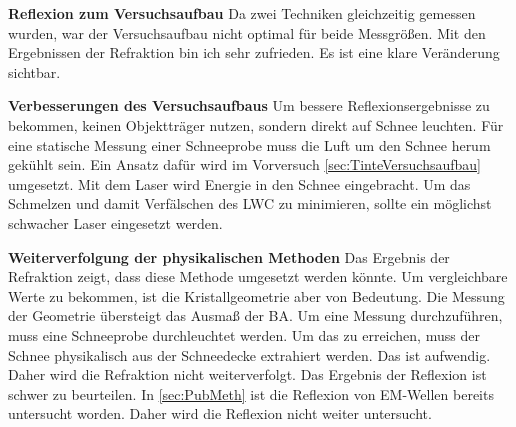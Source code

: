 \textbf{Reflexion zum Versuchsaufbau}
Da zwei Techniken gleichzeitig gemessen wurden, war der Versuchsaufbau nicht optimal für beide Messgrößen. Mit den Ergebnissen der Refraktion bin ich sehr zufrieden. Es ist eine klare Veränderung sichtbar.

\textbf{Verbesserungen des Versuchsaufbaus}
Um bessere Reflexionsergebnisse zu bekommen, keinen Objektträger nutzen, sondern direkt auf Schnee leuchten. Für eine statische Messung einer Schneeprobe muss die Luft um den Schnee herum gekühlt sein. Ein Ansatz dafür wird im Vorversuch \ref{sec:TinteVersuchsaufbau} umgesetzt. Mit dem Laser wird Energie in den Schnee eingebracht. Um das Schmelzen und damit Verfälschen des LWC zu minimieren, sollte ein möglichst schwacher Laser eingesetzt werden.

\textbf{Weiterverfolgung der physikalischen Methoden}
Das Ergebnis der Refraktion zeigt, dass diese Methode umgesetzt werden könnte. Um vergleichbare Werte zu bekommen, ist die Kristallgeometrie aber von Bedeutung. Die Messung der Geometrie übersteigt das Ausmaß der BA. Um eine Messung durchzuführen, muss eine Schneeprobe durchleuchtet werden. Um das zu erreichen, muss der Schnee physikalisch aus der Schneedecke extrahiert werden. Das ist aufwendig. Daher wird die Refraktion nicht weiterverfolgt. Das Ergebnis der Reflexion ist schwer zu beurteilen. In \ref{sec:PubMeth} ist die Reflexion von EM-Wellen bereits untersucht worden. Daher wird die Reflexion nicht weiter untersucht.

